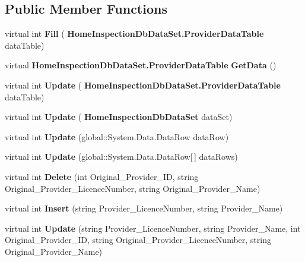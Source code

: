 \subsection*{Public Member Functions}
\begin{DoxyCompactItemize}
\item 
\mbox{\label{class_a_f_h___scheduler_1_1_home_inspection_db_data_set_table_adapters_1_1_provider_table_adapter_a07dc564152c2a719760bc14e98cc48b8}} 
virtual int {\bfseries Fill} (\textbf{ Home\+Inspection\+Db\+Data\+Set.\+Provider\+Data\+Table} data\+Table)
\item 
\mbox{\label{class_a_f_h___scheduler_1_1_home_inspection_db_data_set_table_adapters_1_1_provider_table_adapter_ac5cdeb804fd291c77346862baf471f1a}} 
virtual \textbf{ Home\+Inspection\+Db\+Data\+Set.\+Provider\+Data\+Table} {\bfseries Get\+Data} ()
\item 
\mbox{\label{class_a_f_h___scheduler_1_1_home_inspection_db_data_set_table_adapters_1_1_provider_table_adapter_a2ba48e11c20384d889034a6e8856df47}} 
virtual int {\bfseries Update} (\textbf{ Home\+Inspection\+Db\+Data\+Set.\+Provider\+Data\+Table} data\+Table)
\item 
\mbox{\label{class_a_f_h___scheduler_1_1_home_inspection_db_data_set_table_adapters_1_1_provider_table_adapter_a2ab9d7e3854d9ee811401ffa2611b054}} 
virtual int {\bfseries Update} (\textbf{ Home\+Inspection\+Db\+Data\+Set} data\+Set)
\item 
\mbox{\label{class_a_f_h___scheduler_1_1_home_inspection_db_data_set_table_adapters_1_1_provider_table_adapter_a6cdfcdca29799c402ea7db4498396bbd}} 
virtual int {\bfseries Update} (global\+::\+System.\+Data.\+Data\+Row data\+Row)
\item 
\mbox{\label{class_a_f_h___scheduler_1_1_home_inspection_db_data_set_table_adapters_1_1_provider_table_adapter_a9cf2e79153bfbf5552e07a64ec7fd00c}} 
virtual int {\bfseries Update} (global\+::\+System.\+Data.\+Data\+Row[$\,$] data\+Rows)
\item 
\mbox{\label{class_a_f_h___scheduler_1_1_home_inspection_db_data_set_table_adapters_1_1_provider_table_adapter_a67fad2cbb5082aa8c17151609dd0f19a}} 
virtual int {\bfseries Delete} (int Original\+\_\+\+Provider\+\_\+\+ID, string Original\+\_\+\+Provider\+\_\+\+Licence\+Number, string Original\+\_\+\+Provider\+\_\+\+Name)
\item 
\mbox{\label{class_a_f_h___scheduler_1_1_home_inspection_db_data_set_table_adapters_1_1_provider_table_adapter_a7d768cba5cc6255cae105765ae75b190}} 
virtual int {\bfseries Insert} (string Provider\+\_\+\+Licence\+Number, string Provider\+\_\+\+Name)
\item 
\mbox{\label{class_a_f_h___scheduler_1_1_home_inspection_db_data_set_table_adapters_1_1_provider_table_adapter_a34d984181db8d12bb9758970f880a2d4}} 
virtual int {\bfseries Update} (string Provider\+\_\+\+Licence\+Number, string Provider\+\_\+\+Name, int Original\+\_\+\+Provider\+\_\+\+ID, string Original\+\_\+\+Provider\+\_\+\+Licence\+Number, string Original\+\_\+\+Provider\+\_\+\+Name)
\end{DoxyCompactItemize}
